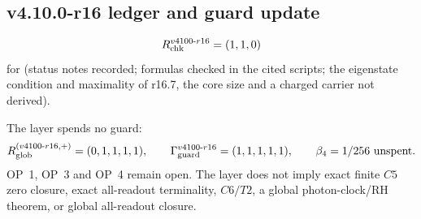 \subsection*{v4.10.0-r16 ledger and guard update}
\label{subsec:v4100-r16-ledger-guard}

\[
R_{\rm chk}^{v4100\text{-}r16}=(1,1,0)
\]
for (status notes recorded; formulas checked in the cited scripts; the eigenstate condition and maximality of r16.7, the core
size and a charged carrier not derived).

The layer spends no guard:
\[
R_{\rm glob}^{(v4100\text{-}r16,+)}=(0,1,1,1,1),
\qquad
\Gamma_{\rm guard}^{v4100\text{-}r16}=(1,1,1,1,1),
\qquad
\beta_4=1/256\ \text{unspent}.
\]
OP~1, OP~3 and OP~4 remain open.  The layer does not imply exact finite \(C5\) zero closure, exact all-readout terminality,
\(C6/T2\), a global photon-clock/RH theorem, or global all-readout closure.
